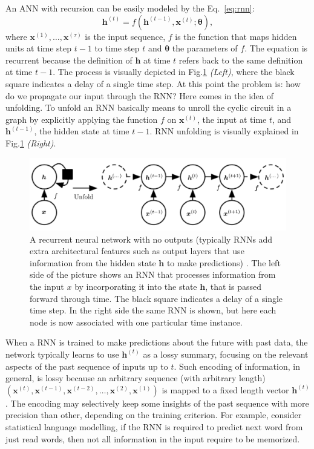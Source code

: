 An ANN with recursion can be easily modeled by the Eq.~\ref{eq:rnn}:
\begin{equation}
  \label{eq:rnn}
  \bm{h}^{(t)} = f ( \bm{h}^{(t - 1)}, \bm{x}^{(t)} ; \bm{\theta} ),
\end{equation}
where $\bm{x}^{(1)}, \ldots, \bm{x}^{(\tau)}$ is the input sequence,
$f$ is the function that maps hidden units at time step $t - 1$ to
time step $t$ and $\bm{\theta}$ the parameters of $f$. The equation is
recurrent because the definition of $\bm{h}$ at time $t$ refers back
to the same definition at time $t - 1$. The process is visually
depicted in Fig.\ref{fig:rnn-with-unfold} \emph{(Left)}, where the
black square indicates a delay of a single time step. At this point
the problem is: how do we propagate our input through the RNN? Here
comes in the idea of unfolding. To unfold an RNN basically means to
unroll the cyclic circuit in a graph by explicitly applying the
function $f$ on $\bm{x}^{(t)}$, the input at time $t$, and
$\bm{h}^{(t-1)}$, the hidden state at time $t - 1$. RNN unfolding is
visually explained in Fig.\ref{fig:rnn-with-unfold} \emph{(Right)}.

\begin{figure}[H]
  \centering
  \includegraphics[width=.8\textwidth]{figures/rnn-with-unfold.png}
  \caption[Recurrent network circuit diagram and unfolded
    computational graph]{ A recurrent neural network with no outputs
    (typically RNNs add extra architectural features such as output
    layers that use information from the hidden state $\bm{h}$ to make
    predictions) \cite{goodfellow2016deep}. The left side of the
    picture shows an RNN that processes information from the input $x$
    by incorporating it into the state $\bm{h}$, that is passed
    forward through time. The black square indicates a delay of a
    single time step. In the right side the same RNN is shown, but
    here each node is now associated with one particular time
    instance. }
  \label{fig:rnn-with-unfold}
\end{figure}

When a RNN is trained to make predictions about the future with past
data, the network typically learns to use $\bm{h}^{(t)}$ as a lossy
summary, focusing on the relevant aspects of the past sequence of
inputs up to $t$. Such encoding of information, in general, is lossy
because an arbitrary sequence (with arbitrary length) $( \bm{x}^{(t)},
\bm{x}^{(t-1)}, \bm{x}^{(t-2)} , \ldots , \bm{x}^{(2)}, \bm{x}^{(1)}
)$ is mapped to a fixed length vector $\bm{h}^{(t)}$. The encoding may
selectively keep some insights of the past sequence with more
precision than other, depending on the training criterion. For
example, consider statistical language modelling, if the RNN is
required to predict next word from just read words, then not all
information in the input require to be memorized.

